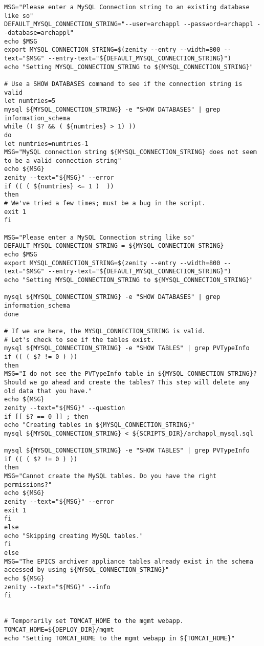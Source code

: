 \documentclass[11pt
  , a4paper
  , article
  , oneside
]{memoir}
\begin{document}
\begin{lstlisting}[style=termstyle]
MSG="Please enter a MySQL Connection string to an existing database like so"
DEFAULT_MYSQL_CONNECTION_STRING="--user=archappl --password=archappl --database=archappl"
echo $MSG
export MYSQL_CONNECTION_STRING=$(zenity --entry --width=800 --text="$MSG" --entry-text="${DEFAULT_MYSQL_CONNECTION_STRING}")
echo "Setting MYSQL_CONNECTION_STRING to ${MYSQL_CONNECTION_STRING}"

# Use a SHOW DATABASES command to see if the connection string is valid
let numtries=5
mysql ${MYSQL_CONNECTION_STRING} -e "SHOW DATABASES" | grep information_schema 
while (( $? && ( ${numtries} > 1) ))
do
let numtries=numtries-1
MSG="MySQL connection string ${MYSQL_CONNECTION_STRING} does not seem to be a valid connection string"
echo ${MSG}
zenity --text="${MSG}" --error
if (( ( ${numtries} <= 1 )  ))
then
# We've tried a few times; must be a bug in the script.
exit 1
fi

MSG="Please enter a MySQL Connection string like so"
DEFAULT_MYSQL_CONNECTION_STRING = ${MYSQL_CONNECTION_STRING}
echo $MSG
export MYSQL_CONNECTION_STRING=$(zenity --entry --width=800 --text="$MSG" --entry-text="${DEFAULT_MYSQL_CONNECTION_STRING}")
echo "Setting MYSQL_CONNECTION_STRING to ${MYSQL_CONNECTION_STRING}"

mysql ${MYSQL_CONNECTION_STRING} -e "SHOW DATABASES" | grep information_schema
done

# If we are here, the MYSQL_CONNECTION_STRING is valid.
# Let's check to see if the tables exist.
mysql ${MYSQL_CONNECTION_STRING} -e "SHOW TABLES" | grep PVTypeInfo
if (( ( $? != 0 ) ))
then
MSG="I do not see the PVTypeInfo table in ${MYSQL_CONNECTION_STRING}? Should we go ahead and create the tables? This step will delete any old data that you have."
echo ${MSG}
zenity --text="${MSG}" --question
if [[ $? == 0 ]] ; then
echo "Creating tables in ${MYSQL_CONNECTION_STRING}"
mysql ${MYSQL_CONNECTION_STRING} < ${SCRIPTS_DIR}/archappl_mysql.sql

mysql ${MYSQL_CONNECTION_STRING} -e "SHOW TABLES" | grep PVTypeInfo
if (( ( $? != 0 ) ))
then
MSG="Cannot create the MySQL tables. Do you have the right permissions?"
echo ${MSG}
zenity --text="${MSG}" --error
exit 1
fi
else
echo "Skipping creating MySQL tables."
fi
else 
MSG="The EPICS archiver appliance tables already exist in the schema accessed by using ${MYSQL_CONNECTION_STRING}"
echo ${MSG}
zenity --text="${MSG}" --info	
fi


# Temporarily set TOMCAT_HOME to the mgmt webapp.
TOMCAT_HOME=${DEPLOY_DIR}/mgmt
echo "Setting TOMCAT_HOME to the mgmt webapp in ${TOMCAT_HOME}"


\end{lstlisting}
\end{document}
